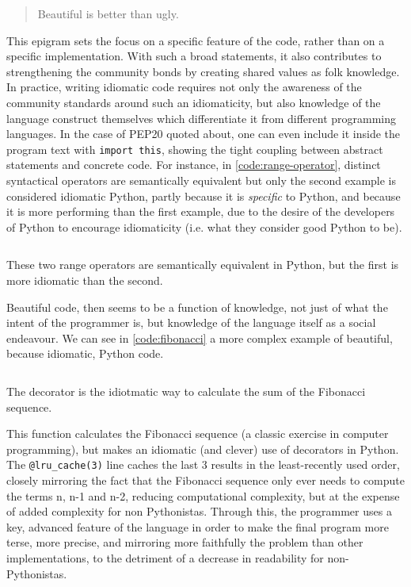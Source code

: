 \begin{quote}
  Beautiful is better than ugly. \citep{peters_pep_2004}
\end{quote}

This epigram sets the focus on a specific feature of the code, rather than on a specific implementation. With such a broad statements, it also contributes to strengthening the community bonds by creating shared values as folk knowledge. In practice, writing idiomatic code requires not only the awareness of the community standards around such an idiomaticity, but also knowledge of the language construct themselves which differentiate it from different programming languages. In the case of PEP20 quoted about, one can even include it inside the program text with \lstinline{import this}, showing the tight coupling between abstract statements and concrete code. For instance, in \ref{code:range-operator}, distinct syntactical operators are semantically equivalent but only the second example is considered idiomatic Python, partly because it is \emph{specific} to Python, and because it is more performing than the first example, due to the desire of the developers of Python to encourage idiomaticity (i.e. what they consider good Python to be).

\begin{listing}
  \inputminted{python}{./corpus/range.py}
  \caption{These two range operators are semantically equivalent in Python, but the first is more idiomatic than the second.}
  \label{code:range-operator}
\end{listing}

Beautiful code, then seems to be a function of knowledge, not just of what the intent of the programmer is, but knowledge of the language itself as a social endeavour. We can see in \ref{code:fibonacci} a more complex example of beautiful, because idiomatic, Python code.

\begin{listing}
  \inputminted{python}{./corpus/fibonacci.py}
  \caption{The decorator is the idiotmatic way to calculate the sum of the Fibonacci sequence. \citep{schmitz_what_2015}}
  \label{code:fibonacci}
\end{listing}

This function calculates the Fibonacci sequence (a classic exercise in computer programming), but makes an idiomatic (and clever) use of decorators in Python. The \lstinline{@lru_cache(3)} line caches the last 3 results in the least-recently used order, closely mirroring the fact that the Fibonacci sequence only ever needs to compute the terms n, n-1 and n-2, reducing computational complexity, but at the expense of added complexity for non Pythonistas. Through this, the programmer uses a key, advanced feature of the language in order to make the final program more terse, more precise, and mirroring more faithfully the problem than other implementations, to the detriment of a decrease in readability for non-Pythonistas.


